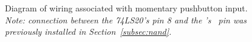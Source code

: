 \begin{figure}
    \centering
    \hfil
    \caption{Diagram of wiring associated with momentary pushbutton input.
        \textit{Note: connection between the 74LS20's pin 8 and the \developmentboard's
        \mcubuttonnand\ pin was previously installed in Section~\ref{subsec:nand}.}
        \label{fig:pushbutton-diagram}}
\end{figure}

\disconnect\

